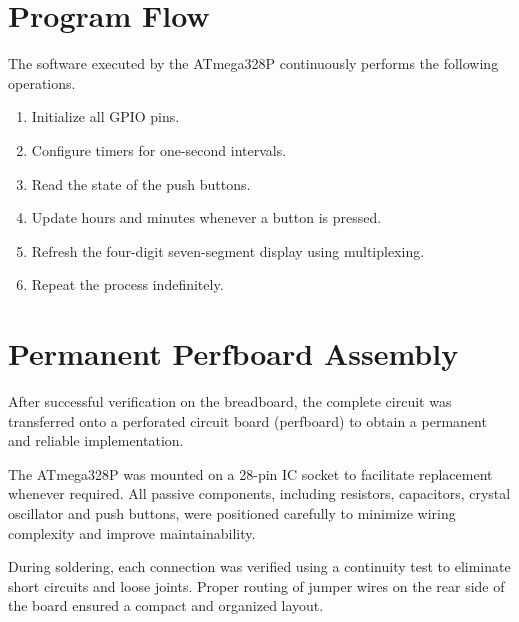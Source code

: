 \documentclass[12pt,a4paper]{article}
\begin{document}

\section{Program Flow}

The software executed by the ATmega328P continuously performs the following operations.

\begin{enumerate}

\item Initialize all GPIO pins.

\item Configure timers for one-second intervals.

\item Read the state of the push buttons.

\item Update hours and minutes whenever a button is pressed.

\item Refresh the four-digit seven-segment display using multiplexing.

\item Repeat the process indefinitely.

\end{enumerate}


\section{Permanent Perfboard Assembly}

After successful verification on the breadboard, the complete circuit was transferred onto a perforated circuit board (perfboard) to obtain a permanent and reliable implementation.

The ATmega328P was mounted on a 28-pin IC socket to facilitate replacement whenever required. All passive components, including resistors, capacitors, crystal oscillator and push buttons, were positioned carefully to minimize wiring complexity and improve maintainability.

During soldering, each connection was verified using a continuity test to eliminate short circuits and loose joints. Proper routing of jumper wires on the rear side of the board ensured a compact and organized layout.
\end{document}
